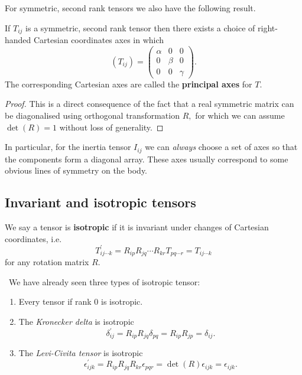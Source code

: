 For symmetric, second rank tensors we also have the following result.
\begin{proposition}
    If $T_{i j}$ is a symmetric, second rank tensor then there exists a choice of right-handed Cartesian coordinates axes in which
    \[
    \left(T_{i j}\right)=\begin{pmatrix}
        \alpha & 0 & 0 \\
    0 & \beta & 0 \\
    0 & 0 & \gamma
    \end{pmatrix}.
    \]
    The corresponding Cartesian axes are called the \textbf{principal axes} for $T$.
\end{proposition}
\begin{proof}
    This is a direct consequence of the fact that a real symmetric matrix can be diagonalised using orthogonal transformation $R,$ for which we can assume $\det(R)=1$ without loss of generality.
\end{proof}
In particular, for the inertia tensor $I_{i j}$ we can \textit{always} choose a set of axes so that the components form a diagonal array. These axes usually correspond to some obvious lines of symmetry on the body.

\subsection{Invariant and isotropic tensors}

\begin{definition}
    We say a tensor is \textbf{isotropic} if it is invariant under changes of Cartesian coordinates, i.e.
    \[
    T_{i j \cdots k}^{\prime}=R_{i p} R_{j q} \cdots R_{k r} T_{p q \cdots r}=T_{i j \cdots k}
    \]
    for any rotation matrix $R$.
\end{definition}

\begin{example}\
    We have already seen three types of isotropic tensor:
    \begin{enumerate}
        \item Every tensor if rank 0 is isotropic.
        \item The \textit{Kronecker delta} is isotropic
        \[
        \delta_{i j}^{\prime}=R_{i p} R_{j q} \delta_{p q}=R_{i p} R_{j p}=\delta_{i j}.
        \]
        \item The \textit{Levi-Civita tensor} is isotropic
        \[
        \epsilon_{i j k}^{\prime}=R_{i p} R_{j q} R_{k r} \epsilon_{p q r}=\operatorname{det}(R) \epsilon_{i j k}=\epsilon_{i j k}.
        \]
    \end{enumerate}
\end{example}

